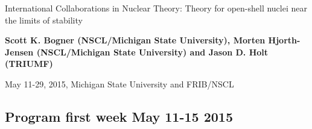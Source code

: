 \documentclass[%
twoside,                 %
final,                   %
10pt]{article}
\begin{document}




\thispagestyle{empty}

\begin{center}
{\LARGE\bf
\begin{spacing}{1.25}
International Collaborations in Nuclear Theory: Theory for open-shell nuclei near the limits of stability
\end{spacing}
}
\end{center}


\begin{center}
{\bf Scott K. Bogner (NSCL/Michigan State University), Morten Hjorth-Jensen (NSCL/Michigan State University) and Jason D. Holt (TRIUMF)${}^{}$} \\ [0mm]
\end{center}

    \begin{center}
\end{center}
    


\begin{center} %
May 11-29, 2015, Michigan State University and FRIB/NSCL
\end{center}

\vspace{1cm}


\subsection*{Program first week May 11-15 2015}

\paragraph{}
\end{document}
